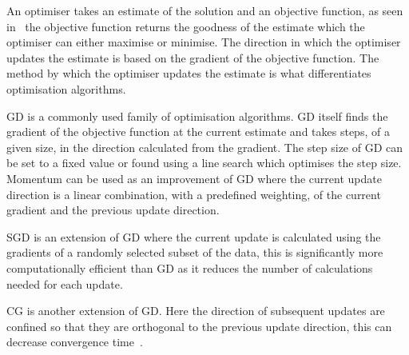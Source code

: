                 An optimiser takes an estimate of the solution and an objective function, as seen in~ the objective function returns the goodness of the estimate which the optimiser can either maximise or minimise. The direction in which the optimiser updates the estimate is based on the gradient of the objective function. The method by which the optimiser updates the estimate is what differentiates optimisation algorithms.
                
                \gls{GD} is a commonly used family of optimisation algorithms. \gls{GD} itself finds the gradient of the objective function at the current estimate %
                and takes steps, of a given size,  in the direction calculated from the gradient. %
                The step size of \gls{GD} can be set to a fixed value or found using a line search which optimises the step size. Momentum can be used as an improvement of \gls{GD} where the current update direction is a linear combination, with a predefined weighting, of the current gradient and the previous update direction. %
                
                \gls{SGD} is an extension of \gls{GD} where the current update is calculated using the gradients of a randomly selected subset of the data, %
                this is significantly more computationally efficient than \gls{GD} as it reduces the number of calculations needed for each update.
                
                \gls{CG} is another extension of \gls{GD}. Here the direction of subsequent updates are confined so that they are orthogonal to the previous update direction, this can decrease convergence time~. %
                
